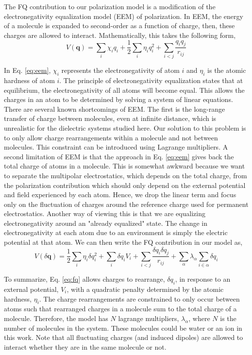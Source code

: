 \documentclass[journal=jacsat,manuscript=article]{achemso}
\begin{document}
The FQ contribution to our polarization model is a modification of the electronegativity
equalization model (EEM) of polarization.\cite{mortier1986electronegativity} In EEM,
the energy of a molecule is expanded to second-order as a function of charge, then,
these charges are allowed to interact. Mathematically, this takes the following form,
\begin{equation}
  V(\bm{q})=\sum_i \chi_i q_i + \frac12 \sum_i \eta_i q_i^2 + \sum_{i<j} \frac{q_i q_j}{r_{ij}}
  \label{eq:eem}
\end{equation}

In Eq. \ref{eq:eem}, $\chi_i$ represents the electronegativity of atom $i$ and
$\eta_i$ is the atomic hardness of atom $i$. The principle of electronegativity
equalization states that  at equilibrium, the electronegativity of all atoms
will become equal. This allows the charges in an atom to be determined by solving
a system of linear equations. There are several known shortcomings of EEM. The first
is the long-range transfer of charge between molecules, even at infinite distance,
which is unrealistic for the dielectric systems studied here.\cite{chen2007qtpie,chen2008unified}
Our solution to this problem is to only allow charge rearrangements within
a molecule and not between molecules. This constraint can be introduced using
Lagrange multipliers. A second limitation of EEM is that the approach in Eq. \ref{eq:eem}
gives back the total charge of atoms in a molecule. This is somewhat awkward because
we want to separate the multipolar electrostatics, which depends on the total charge,
from the polarization contribution which should only depend on the external potential
and field experienced by each atom. Hence, we drop the linear term and focus only on the
fluctuation of charges around the reference charge used for permanent electrostatics.
Another way of viewing this is that we are equalizing electronegativity around an "already
equalized" state. The change in electronegativity at each atom due to an environment is simply
the electric potential at that atom. We can then write the FQ contribution in our
model as,
\begin{equation}
  V(\delta \bm{q})=\frac12\sum_i \eta_i \delta q_i^2 + \sum_i \delta q_i V_i + \sum_{i<j}\frac{\delta q_i \delta q_j}{r_{ij}} + \sum_{\alpha}\lambda_\alpha \sum_{i\in\alpha}\delta q_{i}
  \label{eq:fq}
\end{equation}

To summarize, Eq. \ref{eq:fq} allows charges to rearrange, $\delta q_i$, in response to an external
potential, $V_i$, with a quadratic penalty determined by the atomic hardness, $\eta_i$.
The charge rearrangements are constrained to only occur between atoms such that rearranged
charges in a molecule sum to the total charge of a molecule. Therefore, the model has $N$ lagrange
multipliers, $\lambda_\alpha$, where $N$ is the number of molecules in the system. These molecules
could be water or an ion in this work. Note that all fluctuating charges (and induced
dipoles) are allowed to interact whether they are in the same molecule or not.
\end{document}
